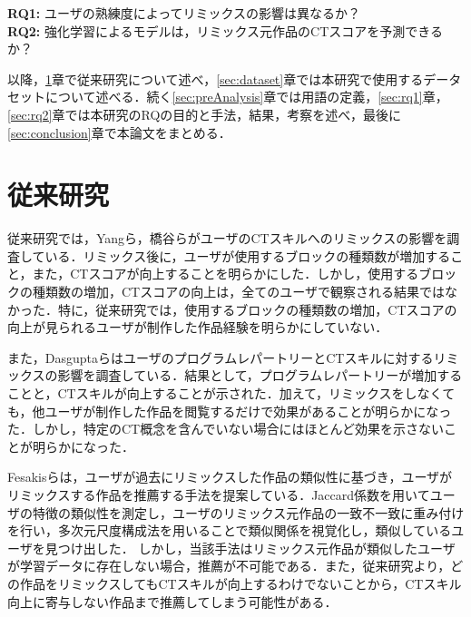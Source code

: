\documentclass[submit,techrep,noauthor]{ipsj}
\begin{document}
\noindent\textbf{RQ1: }ユーザの熟練度によってリミックスの影響は異なるか？\\
\noindent\textbf{RQ2: }強化学習によるモデルは，リミックス元作品のCTスコアを予測できるか？


以降，\ref{sec:related}章で従来研究について述べ，\ref{sec:dataset}章では本研究で使用するデータセットについて述べる．続く\ref{sec:preAnalysis}章では用語の定義，\ref{sec:rq1}章，\ref{sec:rq2}章では本研究のRQの目的と手法，結果，考察を述べ，最後に\ref{sec:conclusion}章で本論文をまとめる．

\section{従来研究}
\label{sec:related}

従来研究では，Yangら\cite{10.1145/2724660.2724674}，橋谷ら\cite{hashitani2022scratch}がユーザのCTスキルへのリミックスの影響を調査している．リミックス後に，ユーザが使用するブロックの種類数が増加すること，また，CTスコアが向上することを明らかにした．しかし，使用するブロックの種類数の増加，CTスコアの向上は，全てのユーザで観察される結果ではなかった．特に，従来研究では，使用するブロックの種類数の増加，CTスコアの向上が見られるユーザが制作した作品経験を明らかにしていない．

また，DasguptaらはユーザのプログラムレパートリーとCTスキルに対するリミックスの影響を調査している\cite{10.1145/2818048.2819984}．結果として，プログラムレパートリーが増加することと，CTスキルが向上することが示された．加えて，リミックスをしなくても，他ユーザが制作した作品を閲覧するだけで効果があることが明らかになった．しかし，特定のCT概念を含んでいない場合にはほとんど効果を示さないことが明らかになった．

Fesakisらは，ユーザが過去にリミックスした作品の類似性に基づき，ユーザがリミックスする作品を推薦する手法を提案している\cite{fesakis2009proposing}．Jaccard係数を用いてユーザの特徴の類似性を測定し，ユーザのリミックス元作品の一致不一致に重み付けを行い，多次元尺度構成法を用いることで類似関係を視覚化し，類似しているユーザを見つけ出した．
しかし，当該手法はリミックス元作品が類似したユーザが学習データに存在しない場合，推薦が不可能である．また，従来研究\cite{10.1145/2724660.2724674}\cite{hashitani2022scratch}\cite{10.1145/2818048.2819984}より，どの作品をリミックスしてもCTスキルが向上するわけでないことから，CTスキル向上に寄与しない作品まで推薦してしまう可能性がある．
\end{document}

